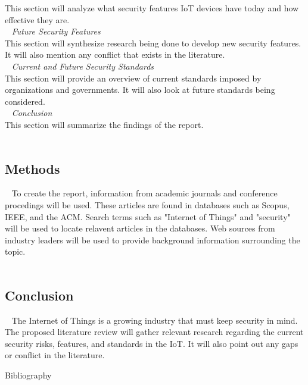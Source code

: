 \documentclass[letterpaper, 12pt]{texMemo}
\begin{document}
\begin{flushleft}
This section will analyze what security features IoT devices have today and how effective they are.\\
~\newline
\textit{Future Security Features}\\
This section will synthesize research being done to develop new security features. It will also mention any conflict that 
exists in the literature.\\
~\newline
\textit{Current and Future Security Standards}\\
This section will provide an overview of current standards imposed by organizations and governments. It will also look at 
future standards being considered.\\
~\newline
\textit{Conclusion}\\
This section will summarize the findings of the report.\\
~\newline

\subsection*{Methods}
~\newline
To create the report, information from academic journals and conference procedings will be used. These articles are found in 
databases such as Scopus, IEEE, and the ACM. Search terms such as "Internet of Things" and "security" will be used to locate
relavent articles in the databases. Web sources from industry leaders will be used to provide background information surrounding
the topic.\\ 
~\newline

\subsection*{Conclusion}
~\newline
The Internet of Things is a growing industry that must keep security in mind. The proposed literature review will gather relevant 
research regarding the current security risks, features, and standards in the IoT. It will also point out any gaps or conflict in
the literature. 

\newpage
Bibliography\\
~\newline
{}\\
~\newline
{}\\
~\newline
{}\\
~\newline
{}\\
~\newline
{}\\
~\newline
{}\\
\end{flushleft}
\end{document}
